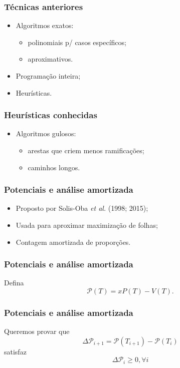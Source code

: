 \documentclass[14pt]{beamer}
\begin{document}
\begin{frame}
\frametitle{T\'ecnicas anteriores}
\begin{itemize}
\item<1->Algoritmos exatos:
\begin{itemize}
\item polinomiais p/ casos espec\'ificos;
\item aproximativos.
\end{itemize}
\item<2->Programa\c{c}\~ao inteira;
\item<3->Heur\'isticas.
\end{itemize}
\end{frame}

\begin{frame}
\frametitle{Heur\'isticas conhecidas}
\begin{itemize}
\item Algoritmos gulosos:
\begin{itemize}
\item arestas que criem menos ramifica\c{c}\~oes;
\item caminhos longos.
\end{itemize}
\end{itemize}
\end{frame}

\begin{frame}
\frametitle{Potenciais e an\'alise amortizada}
\begin{itemize}
\item<1-> Proposto por Solis-Oba \textit{et al.} (1998; 2015);
\item<2-> Usada para aproximar maximiza\c{c}\~ao de folhas;
\item<3-> Contagem amortizada de propor\c{c}\~oes.
\end{itemize}
\end{frame}

\begin{frame}
\frametitle{Potenciais e an\'alise amortizada}
Defina
\begin{equation}
\mathcal{P}(T) = xP(T) - V(T).
\end{equation}
\end{frame}

\begin{frame}
\frametitle{Potenciais e an\'alise amortizada}
Queremos provar que
\begin{equation}
\Delta \mathcal{P}_{i + 1} = \mathcal{P}(T_{i + 1}) - \mathcal{P}(T_i)
\end{equation}
satisfaz
\begin{equation}
\Delta \mathcal{P}_{i} \ge 0, \forall i
\end{equation}
\end{frame}
\end{document}
